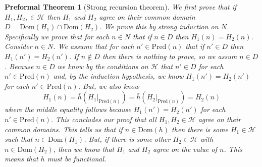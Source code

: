 \documentclass[oneside, 12pt]{book}
\theoremstyle{break}
\newtheorem{preformal definition}[definition]{Preformal Definition}
\newtheorem{preformal theorem}[theorem]{Preformal Theorem}
\newcommand{\mc}[1]{\mathcal{#1}}
\begin{document}
\begin{preformal theorem}[Strong recursion theorem]
				We first prove that if $H_1, H_2, \in \mc{H}$ then $H_1$ and $H_2$ agree on their common domain $D = \text{Dom}(H_1) \cap \text{Dom}(H_2)$.
				We prove this by strong induction on $N$.
				Specifically we prove that for each $n\in N$ that if $n\in D$ then $H_1(n) = H_2(n)$.
				Consider $n\in N$.
				We assume that for each $n' \in \text{Pred}(n)$ that if $n'\in D$ then $H_1(n') = H_2(n')$.
				If $n \not \in D$ then there is nothing to prove, so we assum $n\in D$.
				Because $n\in D$ we know by the conditions on $\mc{H}$ that $n'\in D$ for each $n'\in \text{Pred}(n)$ and, by the induction hypothesis, we know $H_1(n') = H_2(n')$ for each $n'\in \text{Pred}(n)$.
				But, we also know
				\begin{equation*}
					H_1(n) = \bar{h}\left(H_1|_{\text{Pred}(n)}\right) = \bar{h}\left(H_2|_{\text{Pred}(n)}\right) = H_2(n)
				\end{equation*}
				where the middle equality follows because $H_1(n') = H_2(n')$ for each $n'\in \text{Pred}(n)$.
				This concludes our proof that all $H_1, H_2 \in \mc{H}$ agree on their common domains. 
				This tells us that if $n\in \text{Dom}(h)$ then there is some $H_1 \in \mc{H}$ such that $n\in \text{Dom}(H_1)$. But, if there is some other $H_2 \in \mc{H}$ with $n\in \text{Dom}(H_2)$, then we know that $H_1$ and $H_2$ agree on the value of $n$.
				This means that $h$ must be functional.
			\end{preformal theorem}
			
\end{document}
